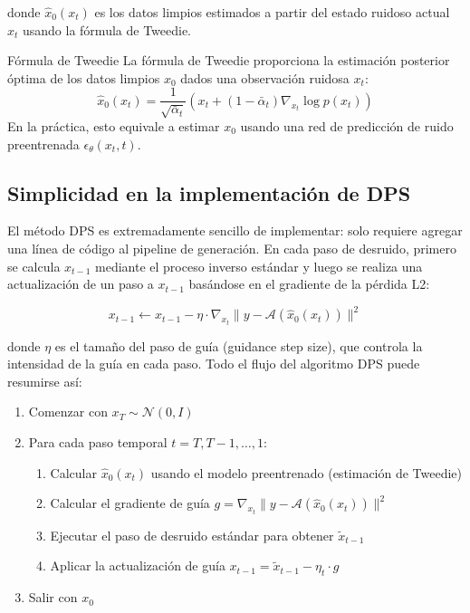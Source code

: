 \documentclass[a4paper]{article}
\begin{document}
donde $\hat{x}_0(x_t)$ es los datos limpios estimados a partir del estado ruidoso actual $x_t$ usando la fórmula de Tweedie.

\begin{knowledgebox}{Fórmula de Tweedie}
La fórmula de Tweedie proporciona la estimación posterior óptima de los datos limpios $x_0$ dados una observación ruidosa $x_t$:
$$\hat{x}_0(x_t) = \frac{1}{\sqrt{\bar{\alpha}_t}} \left( x_t + (1 - \bar{\alpha}_t) \nabla_{x_t} \log p(x_t) \right)$$
En la práctica, esto equivale a estimar $x_0$ usando una red de predicción de ruido preentrenada $\epsilon_\theta(x_t, t)$.
\end{knowledgebox}

\subsection{Simplicidad en la implementación de DPS}

El método DPS es extremadamente sencillo de implementar: solo requiere agregar una línea de código al pipeline de generación. En cada paso de desruido, primero se calcula $x_{t-1}$ mediante el proceso inverso estándar y luego se realiza una actualización de un paso a $x_{t-1}$ basándose en el gradiente de la pérdida L2:

$$x_{t-1} \leftarrow x_{t-1} - \eta \cdot \nabla_{x_t} \| y - \mathcal{A}(\hat{x}_0(x_t)) \|^2$$

donde $\eta$ es el tamaño del paso de guía (guidance step size), que controla la intensidad de la guía en cada paso. Todo el flujo del algoritmo DPS puede resumirse así:

\begin{enumerate}
    \item Comenzar con $x_T \sim \mathcal{N}(0, I)$
    \item Para cada paso temporal $t = T, T-1, \ldots, 1$:
    \begin{enumerate}
        \item Calcular $\hat{x}_0(x_t)$ usando el modelo preentrenado (estimación de Tweedie)
        \item Calcular el gradiente de guía $g = \nabla_{x_t} \| y - \mathcal{A}(\hat{x}_0(x_t)) \|^2$
        \item Ejecutar el paso de desruido estándar para obtener $\tilde{x}_{t-1}$
        \item Aplicar la actualización de guía $x_{t-1} = \tilde{x}_{t-1} - \eta_t \cdot g$
    \end{enumerate}
    \item Salir con $x_0$
\end{enumerate}
\end{document}
